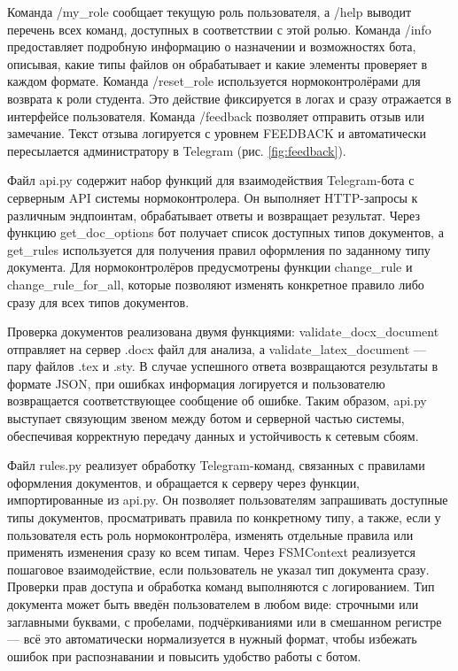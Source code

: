 \documentclass{report}
\begin{document}

Команда /my\_role сообщает текущую роль пользователя, а /help выводит перечень всех команд, доступных в соответствии с этой ролью. Команда /info предоставляет подробную информацию о назначении и возможностях бота, описывая, какие типы файлов он обрабатывает и какие элементы проверяет в каждом формате. Команда /reset\_role используется нормоконтролёрами для возврата к роли студента. Это действие фиксируется в логах и сразу отражается в интерфейсе пользователя. Команда /feedback позволяет отправить отзыв или замечание. Текст отзыва логируется с уровнем FEEDBACK и автоматически пересылается администратору в Telegram (рис. \ref{fig:feedback}). 


Файл api.py содержит набор функций для взаимодействия Telegram-бота с серверным API системы нормоконтролера. Он выполняет HTTP-запросы к различным эндпоинтам, обрабатывает ответы и возвращает результат. Через функцию get\_doc\_options бот получает список доступных типов документов, а get\_rules используется для получения правил оформления по заданному типу документа. Для нормоконтролёров предусмотрены функции change\_rule и change\_rule\_for\_all, которые позволяют изменять конкретное правило либо сразу для всех типов документов.

Проверка документов реализована двумя функциями: validate\_docx\_document отправляет на сервер .docx файл для анализа, а validate\_latex\_document — пару файлов .tex и .sty. В случае успешного ответа возвращаются результаты в формате JSON, при ошибках информация логируется и пользователю возвращается соответствующее сообщение об ошибке. Таким образом, api.py выступает связующим звеном между ботом и серверной частью системы, обеспечивая корректную передачу данных и устойчивость к сетевым сбоям.

Файл rules.py реализует обработку Telegram-команд, связанных с правилами оформления документов, и обращается к серверу через функции, импортированные из api.py. Он позволяет пользователям запрашивать доступные типы документов, просматривать правила по конкретному типу, а также, если у пользователя есть роль нормоконтролёра, изменять отдельные правила или применять изменения сразу ко всем типам. Через FSMContext реализуется пошаговое взаимодействие, если пользователь не указал тип документа сразу. Проверки прав доступа и обработка команд выполняются с логированием. Тип документа может быть введён пользователем в любом виде: строчными или заглавными буквами, с пробелами, подчёркиваниями или в смешанном регистре — всё это автоматически нормализуется в нужный формат, чтобы избежать ошибок при распознавании и повысить удобство работы с ботом.
\end{document}
